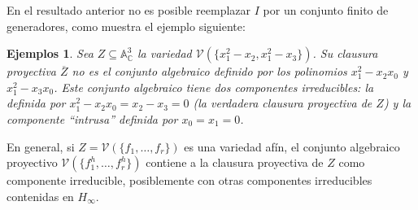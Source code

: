 \documentclass[a4paper,10pt]{book}
\newtheorem{eje}[thm]{Ejemplos}
\newcommand{\CC}{\mathbb C}
\newcommand{\AAA}{\mathbb A}
\newcommand{\VV}{{\mathcal V}}
\begin{document}
En el resultado anterior no es posible reemplazar $I$ por un conjunto finito de generadores, como muestra el ejemplo siguiente:

\begin{eje}
 \emph{Sea $Z\subseteq\AAA^3_\CC$ la variedad $\VV(\{x_1^2-x_2,x_1^2-x_3\})$. Su clausura proyectiva $\overline Z$ {\it no es} el conjunto algebraico definido por los polinomios $x_1^2-x_2x_0$ y $x_1^2-x_3x_0$. Este conjunto algebraico tiene dos componentes irreducibles: la definida por $x_1^2-x_2x_0=x_2-x_3=0$ (la verdadera clausura proyectiva de $Z$) y la componente ``intrusa'' definida por $x_0=x_1=0$.}
\end{eje}

En general, si $Z=\VV(\{f_1,\ldots,f_r\})$ es una variedad afín, el conjunto algebraico proyectivo $\VV(\{f_1^h,\ldots,f_r^h\})$ contiene a la clausura proyectiva de $Z$ como componente irreducible, posiblemente con otras componentes irreducibles contenidas en $H_\infty$.
\end{document}
